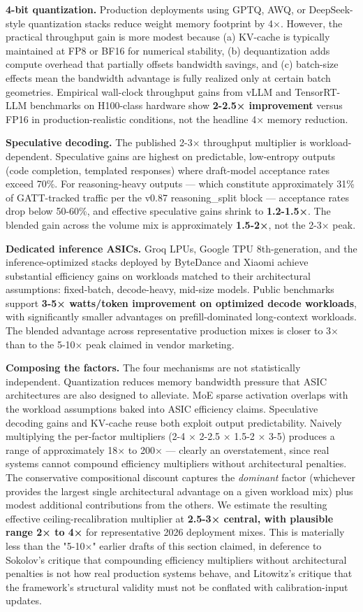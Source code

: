 \documentclass[11pt,a4paper]{article}
\begin{document}
\textbf{4-bit quantization.} Production deployments using GPTQ, AWQ, or DeepSeek-style quantization stacks reduce weight memory footprint by 4×. However, the practical throughput gain is more modest because (a) KV-cache is typically maintained at FP8 or BF16 for numerical stability, (b) dequantization adds compute overhead that partially offsets bandwidth savings, and (c) batch-size effects mean the bandwidth advantage is fully realized only at certain batch geometries. Empirical wall-clock throughput gains from vLLM and TensorRT-LLM benchmarks on H100-class hardware show \textbf{2-2.5× improvement} versus FP16 in production-realistic conditions, not the headline 4× memory reduction.

\textbf{Speculative decoding.} The published 2-3× throughput multiplier is workload-dependent. Speculative gains are highest on predictable, low-entropy outputs (code completion, templated responses) where draft-model acceptance rates exceed 70\%. For reasoning-heavy outputs --- which constitute approximately 31\% of GATT-tracked traffic per the v0.87 reasoning_split block --- acceptance rates drop below 50-60\%, and effective speculative gains shrink to \textbf{1.2-1.5×}. The blended gain across the volume mix is approximately \textbf{1.5-2×}, not the 2-3× peak.

\textbf{Dedicated inference ASICs.} Groq LPUs, Google TPU 8th-generation, and the inference-optimized stacks deployed by ByteDance and Xiaomi achieve substantial efficiency gains on workloads matched to their architectural assumptions: fixed-batch, decode-heavy, mid-size models. Public benchmarks support \textbf{3-5× watts/token improvement on optimized decode workloads}, with significantly smaller advantages on prefill-dominated long-context workloads. The blended advantage across representative production mixes is closer to 3× than to the 5-10× peak claimed in vendor marketing.

\textbf{Composing the factors.} The four mechanisms are not statistically independent. Quantization reduces memory bandwidth pressure that ASIC architectures are also designed to alleviate. MoE sparse activation overlaps with the workload assumptions baked into ASIC efficiency claims. Speculative decoding gains and KV-cache reuse both exploit output predictability. Naively multiplying the per-factor multipliers (2-4 × 2-2.5 × 1.5-2 × 3-5) produces a range of approximately 18× to 200× --- clearly an overstatement, since real systems cannot compound efficiency multipliers without architectural penalties. The conservative compositional discount captures the \emph{dominant} factor (whichever provides the largest single architectural advantage on a given workload mix) plus modest additional contributions from the others. We estimate the resulting effective ceiling-recalibration multiplier at \textbf{2.5-3× central, with plausible range 2× to 4×} for representative 2026 deployment mixes. This is materially less than the "5-10×" earlier drafts of this section claimed, in deference to Sokolov's critique that compounding efficiency multipliers without architectural penalties is not how real production systems behave, and Litowitz's critique that the framework's structural validity must not be conflated with calibration-input updates.
\end{document}
